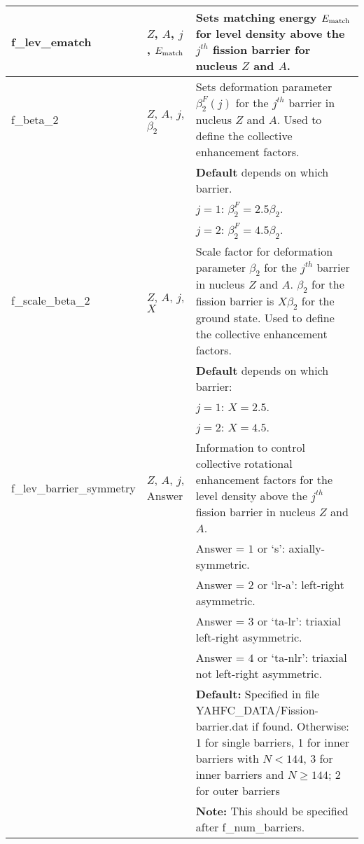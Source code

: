 \documentclass[
10pt,
showpacs,preprintnumbers,nofootinbib,
amsmath,amssymb,
aps,prc,groupedaddress,superscriptaddress,
notitlepage,showkeys
]{revtex4-1}
\begin{document}
\begin{center}
\begin{tabular}{| p{4cm} | p{4cm} | p{9cm} |}
\hline
f\_lev\_ematch  &  $Z$, $A$, $j$, $E_{\rm match}$ &    Sets matching energy $E_{\rm match}$ for level density above the $j^{th}$ fission barrier for nucleus $Z$ and $A$.\\
\hline
f\_beta\_2 & $Z$, $A$, $j$, $\beta_2$ & Sets deformation parameter $\beta_2^F(j)$ for the $j^{th}$ barrier in nucleus $Z$ and $A$. Used to define the collective enhancement factors.\\
& & {\bf Default} depends on which barrier. \\
& & $j = 1$:  $\beta_2^F = 2.5\beta_2$.\\
& & $j = 2$:  $\beta_2^F = 4.5\beta_2$.\\
\hline
f\_scale\_beta\_2 & $Z$, $A$, $j$, $X$ & Scale factor for deformation parameter $\beta_2$ for the $j^{th}$ barrier in nucleus $Z$ and $A$. $\beta_2$ for the fission barrier is $X\beta_2$ for the ground state. Used to define the collective enhancement factors.\\
& & {\bf Default} depends on which barrier: \\
& & $j = 1$:  $X = 2.5$.\\
& & $j = 2$:  $X = 4.5$.\\
\hline
f\_lev\_barrier\_symmetry   &  $Z$, $A$, $j$, Answer & Information to control collective rotational enhancement factors for the level density above the $j^{th}$ fission barrier in nucleus $Z$ and $A$.\\
& & Answer  = $1$ or `s': axially-symmetric.\\
& & Answer  = $2$ or `lr-a': left-right asymmetric.\\
& & Answer  = $3$ or `ta-lr': triaxial left-right asymmetric.\\
& & Answer  = $4$ or `ta-nlr': triaxial not left-right asymmetric.\\
& & {\bf Default:} Specified in file YAHFC\_DATA/Fission-barrier.dat if found. Otherwise: 1 for single barriers, 1 for inner barriers with $N < 144$, 3 for inner barriers and $N \ge 144$; 2 for outer barriers\\
& & {\bf Note:} This should be specified after f\_num\_barriers.\\
\hline
\end{tabular}
\end{center}
%
%
\end{document}
